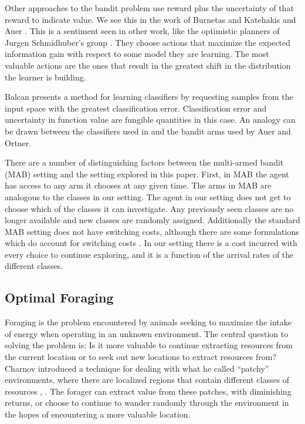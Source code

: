 Other approaches to the bandit problem use reward plus the uncertainty of that
reward to indicate value.  We see this in the work of Burnetas and Katehakis
\cite{burnetas1997optimal} and Auer \cite{auer2003using}.  This is a sentiment
seen in other work, like the optimistic planners of Jurgen Schmidhuber's group
\cite{schmidhuber1997what,schmidhuber2003exploring,schmidhuber2009simple,sun2011planning}.
They choose actions that maximize the expected information gain with respect to
some model they are learning.  The most valuable actions are the ones that
result in the greatest shift in the distribution the learner is building.

Balcan \cite{balcan2006agnostic} presents a method for learning classifiers by
requesting samples from the input space with the greatest classification
error.  Classification error and uncertainty in function value
are fungible quantities in this case.  An analogy can be drawn between
the classifiers used in \cite{balcan2006agnostic} and the bandit arms used by
Auer and Ortner\cite{auer2010ucb}.


There are a number of distinguishing factors between the multi-armed bandit
(MAB) setting and the setting explored in this paper.  First, in MAB the agent
has access to any arm it chooses at any given time.  The arms in MAB are
analogous to the classes in our setting.  The agent in our setting does not get
to choose which of the classes it can investigate.  Any previously seen classes
are no longer available and new classes are randomly assigned.  Additionally
the standard MAB setting does not have switching costs, although there are some
formulations which do account for switching costs
\cite{jun2004survey}.  In our setting there is a cost incurred
with every choice to continue exploring, and it is a function of the arrival
rates of the different classes.

\subsection{Optimal Foraging}

Foraging is the problem encountered by animals seeking to maximize the intake
of energy when operating in an unknown environment.  The central question to
solving the problem is: Is it more valuable to continue extracting resources
from the current location or to seek out new locations to extract resources
from?  Charnov introduced a technique for dealing with what he called
``patchy'' environments, where there are localized regions that contain
different classes of resources \cite{charnov1973optimal},
\cite{charnov1976optimal}.  The forager can extract value from these patches,
with diminishing returns, or choose to continue to wander randomly through the
environment in the hopes of encountering a more valuable location.

